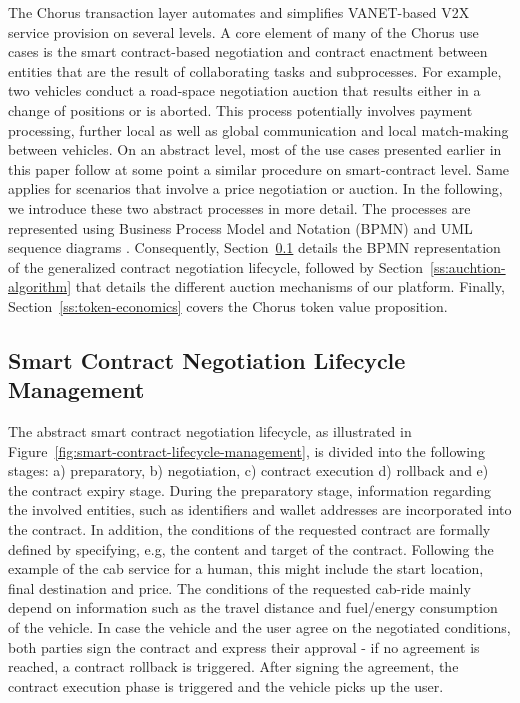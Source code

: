 \documentclass{llncs}
\begin{document}
{		The Chorus transaction layer automates and simplifies VANET-based V2X service provision on several levels. A core element of many of the Chorus use cases is the smart contract-based negotiation and contract enactment between entities that are the result of collaborating tasks and subprocesses. For example, two vehicles conduct a road-space negotiation auction that results either in a change of positions or is aborted. This process potentially involves payment processing, further local as well as global communication and local match-making between vehicles. On an abstract level, most of the use cases presented earlier in this paper follow at some point a similar procedure on smart-contract level. Same applies for scenarios that involve a price negotiation or auction. In the following, we introduce these two abstract processes in more detail. The processes are represented using Business Process Model and Notation (BPMN) \cite{model2011notation} and UML sequence diagrams \cite{msequenceDiagrams}. Consequently, Section~\ref{ss:smart-contract-lifecycle-management} details the BPMN representation of the generalized contract negotiation lifecycle, followed by Section~\ref{ss:auchtion-algorithm} that details the different auction mechanisms of our platform. Finally, Section~\ref{ss:token-economics} covers the Chorus token value proposition.



		
		\subsection{Smart Contract Negotiation Lifecycle Management}
			\label{ss:smart-contract-lifecycle-management}
			
			The abstract smart contract negotiation lifecycle, as illustrated in Figure~\ref{fig:smart-contract-lifecycle-management}, is divided into the following stages: a) preparatory, b) negotiation, c) contract execution d) rollback and e) the contract expiry stage. During the preparatory stage, information regarding the involved entities, such as identifiers and wallet addresses are incorporated into the contract. In addition, the conditions of the requested contract are formally defined by specifying, e.g, the content and target of the contract. Following the example of the cab service for a human, this might include the start location, final destination and price. The conditions of the requested cab-ride mainly depend on information such as the travel distance and fuel/energy consumption of the vehicle. In case the vehicle and the user agree on the negotiated conditions, both parties sign the contract and express their approval - if no agreement is reached, a contract rollback is triggered. After signing the agreement, the contract execution phase is triggered and the vehicle picks up the user. 

}
\end{document}
